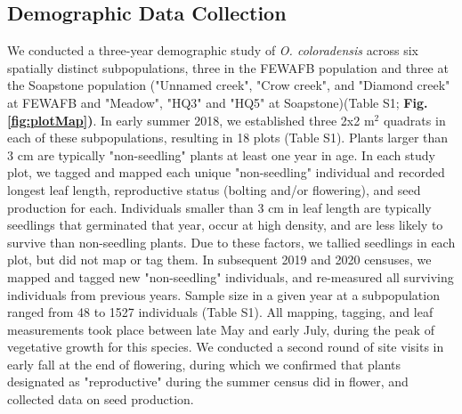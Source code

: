 \documentclass[12pt, letterpaper]{article}
\begin{document}
\subsection{Demographic Data Collection}
 We conducted a three-year demographic study of \textit{O. coloradensis} across six spatially distinct subpopulations, three in the FEWAFB population and three at the Soapstone population ("Unnamed creek", "Crow creek", and "Diamond creek" at FEWAFB and "Meadow", "HQ3" and "HQ5" at Soapstone)(Table S1; \textbf{Fig. \ref{fig:plotMap})}. In early summer 2018, we established three 2\textsf{x}2 m$^2$ quadrats in each of these subpopulations, resulting in 18 plots (Table S1). Plants larger than 3 cm are typically "non-seedling" plants at least one year in age. In each study plot, we tagged and mapped each unique "non-seedling" individual and recorded longest leaf length, reproductive status (bolting and/or flowering), and seed production for each. Individuals smaller than 3 cm in leaf length are typically seedlings that germinated that year, occur at high density, and are less likely to survive than non-seedling plants. Due to these factors, we tallied seedlings in each plot, but did not map or tag them. In subsequent 2019 and 2020 censuses, we mapped and tagged new "non-seedling" individuals, and re-measured all surviving individuals from previous years. Sample size in a given year at a subpopulation ranged from 48 to 1527 individuals (Table S1). All mapping, tagging, and leaf measurements took place between late May and early July, during the peak of vegetative growth for this species. We conducted a second round of site visits in early fall at the end of flowering, during which we confirmed that plants  designated as "reproductive" during the summer census did in flower, and collected data on seed production. 
 
\end{document}

